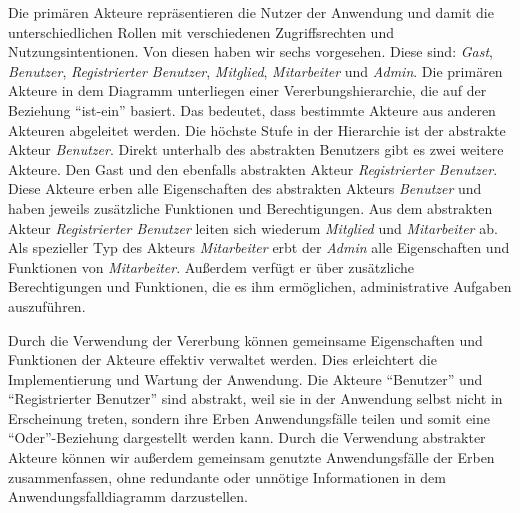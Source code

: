Die primären Akteure repräsentieren die Nutzer der Anwendung und damit die unterschiedlichen Rollen mit verschiedenen Zugriffsrechten und Nutzungsintentionen.
Von diesen haben wir sechs vorgesehen.
Diese sind: \emph{Gast}, \emph{Benutzer}, \emph{Registrierter Benutzer}, \emph{Mitglied}, \emph{Mitarbeiter} und \emph{Admin}.
Die primären Akteure in dem Diagramm unterliegen einer Vererbungshierarchie, die auf der Beziehung \enquote{ist-ein} basiert.
Das bedeutet, dass bestimmte Akteure aus anderen Akteuren abgeleitet werden.
Die höchste Stufe in der Hierarchie ist der abstrakte Akteur \emph{Benutzer}.
Direkt unterhalb des abstrakten Benutzers gibt es zwei weitere Akteure.
Den Gast und den ebenfalls abstrakten Akteur \emph{Registrierter Benutzer}.
Diese Akteure erben alle Eigenschaften des abstrakten Akteurs \emph{Benutzer} und haben jeweils zusätzliche Funktionen und Berechtigungen.
Aus dem abstrakten Akteur \emph{Registrierter Benutzer} leiten sich wiederum \emph{Mitglied} und \emph{Mitarbeiter} ab.
Als spezieller Typ des Akteurs \emph{Mitarbeiter} erbt der \emph{Admin} alle Eigenschaften und Funktionen von \emph{Mitarbeiter}.
Außerdem verfügt er über zusätzliche Berechtigungen und Funktionen, die es ihm ermöglichen, administrative Aufgaben auszuführen.

\medskip

Durch die Verwendung der Vererbung können gemeinsame Eigenschaften und Funktionen der Akteure effektiv verwaltet werden.
Dies erleichtert die Implementierung und Wartung der Anwendung.
Die Akteure \enquote{Benutzer} und \enquote{Registrierter Benutzer} sind abstrakt, weil sie in der Anwendung selbst nicht in Erscheinung treten, sondern ihre Erben Anwendungsfälle teilen und somit eine \enquote{Oder}-Beziehung dargestellt werden kann.
Durch die Verwendung abstrakter Akteure können wir außerdem gemeinsam genutzte Anwendungsfälle der Erben zusammenfassen, ohne redundante oder unnötige Informationen in dem Anwendungsfalldiagramm darzustellen.